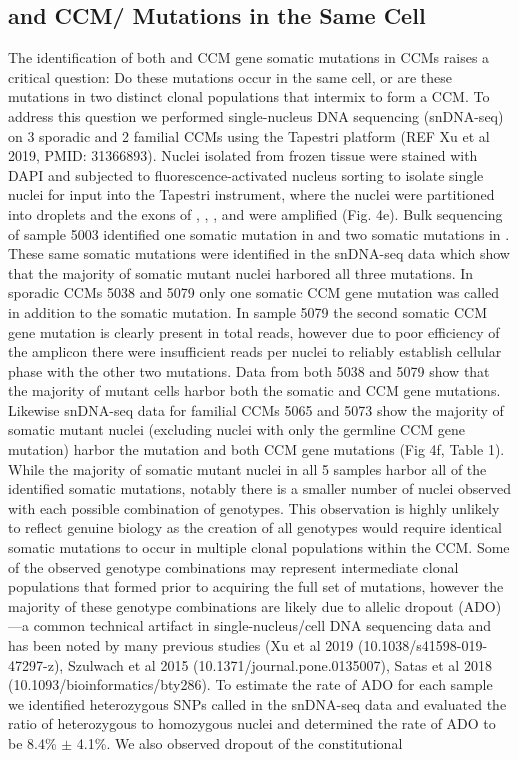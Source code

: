 \subsection{ and CCM/ Mutations in the Same Cell}
The identification of both  and CCM gene somatic mutations in CCMs raises a critical question: Do these mutations occur in the same cell, or are these mutations in two distinct clonal populations that intermix to form a CCM. To address this question we performed single-nucleus DNA sequencing (snDNA-seq) on 3 sporadic and 2 familial CCMs using the Tapestri platform \citep{xu2019} (REF Xu et al 2019, PMID: 31366893). Nuclei isolated from frozen tissue were stained with DAPI and subjected to fluorescence-activated nucleus sorting to isolate single nuclei for input into the Tapestri instrument, where the nuclei were partitioned into droplets and the exons of , , , and  were amplified (Fig. 4e). Bulk sequencing of sample 5003 identified one somatic mutation in  and two somatic mutations in . These same somatic mutations were identified in the snDNA-seq data which show that the majority of somatic mutant nuclei harbored all three mutations. In sporadic CCMs 5038 and 5079 only one somatic CCM gene mutation was called in addition to the  somatic mutation. In sample 5079 the second somatic CCM gene mutation is clearly present in total reads, however due to poor efficiency of the amplicon there were insufficient reads per nuclei to reliably establish cellular phase with the other two mutations. Data from both 5038 and 5079 show that the majority of mutant cells harbor both the somatic  and CCM gene mutations. Likewise snDNA-seq data for familial CCMs 5065 and 5073 show the majority of somatic mutant nuclei (excluding nuclei with only the germline CCM gene mutation) harbor the  mutation and both CCM gene mutations (Fig 4f, Table 1). While the majority of somatic mutant nuclei in all 5 samples harbor all of the identified somatic mutations, notably there is a smaller number of nuclei observed with each possible combination of genotypes. This observation is highly unlikely to reflect genuine biology as the creation of all genotypes would require identical somatic mutations to occur in multiple clonal populations within the CCM. Some of the observed genotype combinations may represent intermediate clonal populations that formed prior to acquiring the full set of mutations, however the majority of these genotype combinations are likely due to allelic dropout (ADO)---a common technical artifact in single-nucleus/cell DNA sequencing data and has been noted by many previous studies \citep{xu2019, szulwach2015, satas2018} (Xu et al 2019 (10.1038/s41598-019-47297-z),  Szulwach et al 2015 (10.1371/journal.pone.0135007), Satas et al 2018 (10.1093/bioinformatics/bty286). To estimate the rate of ADO for each sample we identified heterozygous SNPs called in the snDNA-seq data and evaluated the ratio of heterozygous to homozygous nuclei and determined the rate of ADO to be 8.4\% $\pm$ 4.1\%. We also observed dropout of the constitutional 
